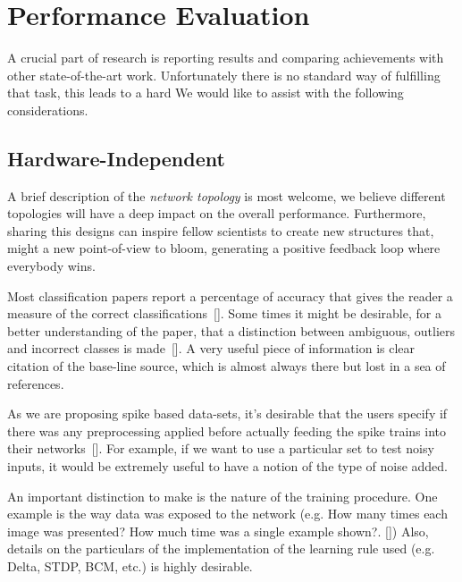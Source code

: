 \section{Performance Evaluation}
\label{sec:eval}

A crucial part of research is reporting results and comparing achievements with other state-of-the-art work. Unfortunately there is no standard way of fulfilling that task, this leads to a hard 
We would like to assist with the following considerations.


\subsection{Hardware-Independent}
A brief description of the \emph{network topology} is most welcome, we believe different topologies will have a deep impact on the overall performance. Furthermore, sharing this designs can inspire fellow scientists to create new structures that, might  a new point-of-view to bloom, generating a positive feedback loop where everybody wins.

Most classification papers report a percentage of accuracy that gives the reader a measure of the correct classifications~[\cite{dietterich1998approximate}]. Some times it might be desirable, for a better understanding of the paper, that a distinction between ambiguous, outliers and incorrect classes is made~[\cite{liu2002performance}]. A very useful piece of information is clear citation of the base-line source, which is almost always there but lost in a sea of references.


As we are proposing spike based data-sets, it's desirable that the users specify if there was any preprocessing applied before actually feeding the spike trains into their networks~[\cite{best-practice-nn-img}]. For example, if we want to use a particular set to test noisy inputs, it would be extremely useful to have a notion of the type of noise added.


An important distinction to make is the nature of the training procedure. One example is the way data was exposed to the network (e.g. How many times each image was presented? How much time was a single example shown?. [\cite{unsup_leraning_diehl}]) Also, details on the particulars of the implementation of the learning rule used (e.g. Delta, STDP, BCM, etc.) is highly desirable. 

